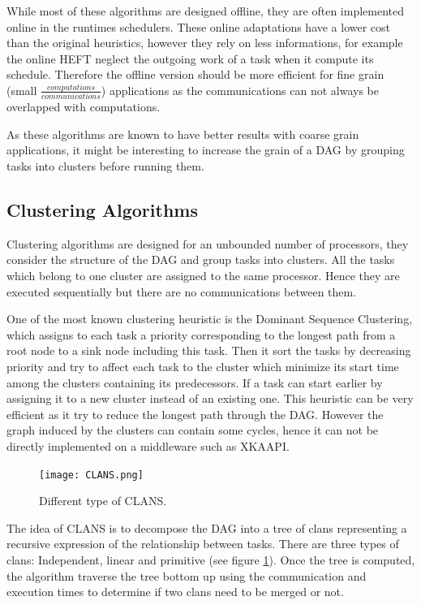 \documentclass[10pt, conference, compsocconf,pdftex,dvipsnames]{IEEEtran}
\begin{document}
While most of these algorithms are designed offline, they are often
implemented online in the runtimes schedulers. These online adaptations have a
lower cost than the original heuristics, however they rely on less
informations, for example the online HEFT neglect the outgoing work of a task
when it compute its schedule. Therefore the offline version should be more
efficient for fine grain (small $\frac{computations}{communications}$)
applications as the communications can not always be overlapped with
computations.

As these algorithms are known to have better results with coarse grain
applications, it might be interesting to increase the grain of a DAG by
grouping tasks into clusters before running them.

\subsection{Clustering Algorithms}

Clustering algorithms are designed for an unbounded number of processors, they
consider the structure of the DAG and group tasks into clusters. All the tasks
which belong to one cluster are assigned to the same processor. Hence they are
executed sequentially but there are no communications between them.  

One of the most known clustering heuristic is the Dominant Sequence
Clustering\cite{yang1994dsc}, which assigns to each task a priority
corresponding to the longest path from a root node to a sink node including
this task. Then it sort the tasks by decreasing priority and try to affect
each task to the cluster which minimize its start time among the clusters
containing its predecessors. If a task can start earlier by assigning it to a
new cluster instead of an existing one.  This heuristic can be very efficient
as it try to reduce the longest path through the DAG. However the graph
induced by the clusters can contain some cycles, hence it can not be directly
implemented on a middleware such as XKAAPI.

\begin{figure}[htb]
    \centering
    \texttt{[image: CLANS.png]}
    \caption{Different type of CLANS.}
    \label{fig:clans}
\end{figure}

The idea of CLANS
\cite{aubum1990efficient,mccreary1993partitioning,mccreary1993graph} is to
decompose the DAG into a tree of clans representing a recursive expression of
the relationship between tasks. 
There are three types of clans:
Independent, linear and primitive (see figure \ref{fig:clans}). Once the tree
is computed, the algorithm traverse the tree bottom up using the communication
and execution times to determine if two clans need to be merged or not.
\end{document}
